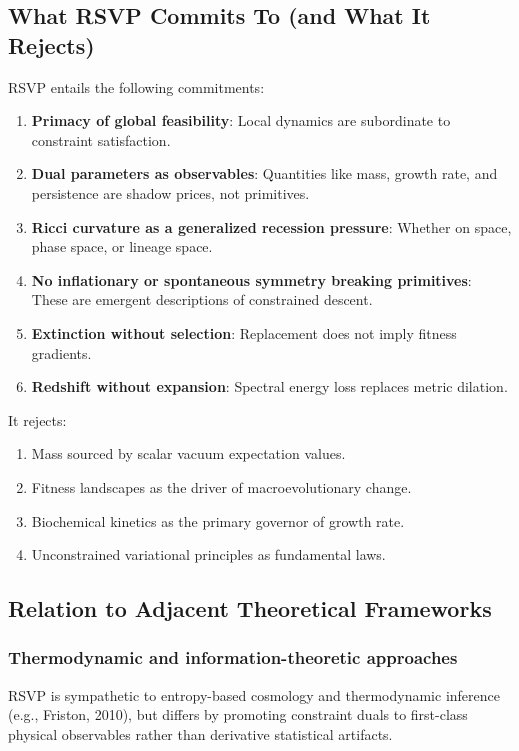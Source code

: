 \documentclass[11pt,a4paper]{article}
\begin{document}
\subsection{What RSVP Commits To (and What It Rejects)}

RSVP entails the following commitments:

\begin{enumerate}
    \item \textbf{Primacy of global feasibility}: Local dynamics are subordinate to constraint satisfaction.
    \item \textbf{Dual parameters as observables}: Quantities like mass, growth rate, and persistence are shadow prices, not primitives.
    \item \textbf{Ricci curvature as a generalized recession pressure}: Whether on space, phase space, or lineage space.
    \item \textbf{No inflationary or spontaneous symmetry breaking primitives}: These are emergent descriptions of constrained descent.
    \item \textbf{Extinction without selection}: Replacement does not imply fitness gradients.
    \item \textbf{Redshift without expansion}: Spectral energy loss replaces metric dilation.
\end{enumerate}

It rejects:

\begin{enumerate}
    \item Mass sourced by scalar vacuum expectation values.
    \item Fitness landscapes as the driver of macroevolutionary change.
    \item Biochemical kinetics as the primary governor of growth rate.
    \item Unconstrained variational principles as fundamental laws.
\end{enumerate}

\subsection{Relation to Adjacent Theoretical Frameworks}

\subsubsection{Thermodynamic and information-theoretic approaches}
RSVP is sympathetic to entropy-based cosmology and thermodynamic inference (e.g., Friston, 2010), but differs by promoting constraint duals to first-class physical observables rather than derivative statistical artifacts.
\end{document}
